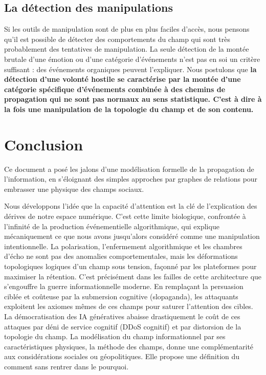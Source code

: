 \documentclass[11pt]{article}
\begin{document}
			
		\subsection{La détection des manipulations}
		
			Si les outils de manipulation sont de plus en plus faciles d'accès, nous pensons qu'il est possible de détecter des comportements du champ qui sont très probablement des tentatives de manipulation. La seule détection de la montée brutale d'une émotion ou d'une catégorie d'événements n'est pas en soi un critère suffisant : des événements organiques peuvent l'expliquer. Nous postulons que \textbf{la détection d'une volonté hostile se caractérise par la montée d'une catégorie spécifique d'événements combinée à des chemins de propagation qui ne sont pas normaux au sens statistique. C'est à dire à la fois une manipulation de la topologie du champ et de son contenu.} 
			
	\section{Conclusion}
	
		Ce document a posé les jalons d'une modélisation formelle de la propagation de l'information, en s'éloignant des simples approches par graphes de relations pour embrasser une physique des champs sociaux. 
		
		Nous développons l'idée que la capacité d'attention est la clé de l'explication des dérives de notre espace numérique. C'est cette limite biologique, confrontée à l'infinité de la production événementielle algorithmique, qui explique mécaniquement ce que nous avons jusqu'alors considéré comme une manipulation intentionnelle. La polarisation, l'enfermement algorithmique et les chambres d'écho ne sont pas des anomalies comportementales, mais les déformations topologiques logiques d'un champ sous tension, façonné par les plateformes pour maximiser la rétention. C'est précisément dans les failles de cette architecture que s'engouffre la guerre informationnelle moderne. En remplaçant la persuasion ciblée et coûteuse par la submersion cognitive (slopaganda), les attaquants exploitent les axiomes mêmes de ces champs pour saturer l'attention des cibles. La démocratisation des IA génératives abaisse drastiquement le coût de ces attaques par déni de service cognitif (DDoS cognitif) et par distorsion de la topologie du champ. La modélisation du champ informationnel par ses caractéristiques physiques, la méthode des champs, donne une complémentarité aux considérations sociales ou géopolitiques. Elle propose une définition du \og{}comment\fg{} sans rentrer dans le \og{}pourquoi\fg{}. 
	
\end{document}
